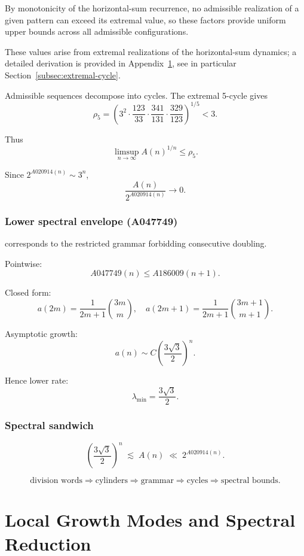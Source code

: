 \documentclass[12pt, oneside]{article}
\numberwithin{equation}{section}
\theoremstyle{definition}
\theoremstyle{plain}
\theoremstyle{remark}
\begin{document}
By monotonicity of the horizontal-sum recurrence, no admissible realization
of a given pattern can exceed its extremal value, so these factors provide
uniform upper bounds across all admissible configurations.

These values arise from extremal realizations of the horizontal-sum dynamics;
a detailed derivation is provided in Appendix~\ref{app:local-growth-compressed}, 
see in particular Section~\ref{subsec:extremal-cycle}.

Admissible sequences decompose into cycles. The extremal 5-cycle gives
\[
\rho_5 =
\left(
3^2 \cdot \frac{123}{33} \cdot \frac{341}{131} \cdot \frac{329}{123}
\right)^{1/5}
< 3.
\]

Thus
\[
\limsup_{n\to\infty} A(n)^{1/n} \le \rho_5.
\]

Since $2^{A020914(n)} \sim 3^n$,
\[
\frac{A(n)}{2^{A020914(n)}} \to 0.
\]

\subsubsection*{Lower spectral envelope (A047749)}
\label{app:A047749-lower-bound}

 corresponds to the restricted grammar forbidding consecutive doubling.

Pointwise:
\[
A047749(n) \le A186009(n+1).
\]

Closed form:
\[
a(2m) = \frac{1}{2m+1}\binom{3m}{m}, \quad
a(2m+1) = \frac{1}{2m+1}\binom{3m+1}{m+1}.
\]

Asymptotic growth:
\[
a(n) \sim C\left(\frac{3\sqrt{3}}{2}\right)^n.
\]

Hence lower rate:
\[
\lambda_{\min} = \frac{3\sqrt{3}}{2}.
\]

\subsubsection*{Spectral sandwich}

\[
\left(\frac{3\sqrt{3}}{2}\right)^n
\;\lesssim\;
A(n)
\;\ll\;
2^{A020914(n)}.
\]

\[
\text{division words}
\Rightarrow
\text{cylinders}
\Rightarrow
\text{grammar}
\Rightarrow
\text{cycles}
\Rightarrow
\text{spectral bounds}.
\]

\section{Local Growth Modes and Spectral Reduction}
\label{app:local-growth-compressed}
\end{document}
